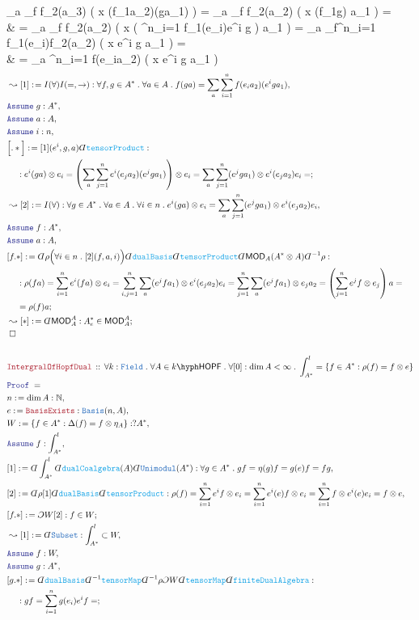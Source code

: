 \documentclass[12pt]{scrartcl}%
\newcommand{\TYPE}[1]{\textcolor{NavyBlue}{\mathtt{#1}}}%
\newcommand{\FUNC}[1]{\textcolor{Cerulean}{\mathtt{#1}}}%
\newcommand{\LOGIC}[1]{\textcolor{Blue}{\mathtt{#1}}}%
\newcommand{\THM}[1]{\textcolor{Maroon}{\mathtt{#1}}}%
\renewcommand{\.}{\; . \;} %
\newcommand{\de}{: \kern 0.1pc =} %
\newcommand{\Theorem}[2]{& \THM{#1} \, :: \, #2 \\ & \Proof = \\ } %
\newcommand{\NewLine}{\\ & \kern 1pc}%
\newcommand{\Page}[1]{ \begin{align*} #1 \end{align*}  }%
\newcommand{ \bd }{ \ByDef }%
\newcommand{\Nat}{\mathbb{N}}%
\newcommand{\Say}[3]{& #1 \de #2 : #3, \\} %
\newcommand{\Conclude}[3]{& #1 \de #2 : #3; \\}%
\newcommand{\Derive}[3]{& \leadsto #1 \de #2 : #3, \\} %
\newcommand{\DeriveConclude}[3]{& \leadsto #1 \de #2 : #3 ; \\} %
\newcommand{\Assume}[2]{& \LOGIC{Assume} \; #1 : #2, \\} %
\newcommand{\QED}{\; \square} %
\newcommand{\EndProof}{& \QED \\} %
\newcommand{\ByDef}{\rotatebox[origin=c]{-180}{$D$}}%
\newcommand{\ByConstr}{\rotatebox[origin=c]{-180}{$C$}}%
\newcommand{\Proof}{\LOGIC{Proof} \; } %
\newcommand{\Field}{\TYPE{Field}}
\newcommand{\RAMOD}[1]{\mathsf{MOD}_{#1}}%
\newcommand{\HOPF}[1]{#1\hyph\mathsf{HOPF}}%
\newcommand{\RHMOD}[1]{\mathsf{MOD}^{#1}_{#1}}%
\begin{document}
{{		 \sum_a \sum_f  f_2(a_3)  \Big( x \;  (f_1a_2)(ga_1) \Big) = 
		 \sum_a \sum_f   f_2(a_2)  \big(  x \; (f_1g) a_1 \big) = \NewLine = 
		 \sum_a \sum_f   f_2(a_2)  \left(  x \; \left( \sum^n_{i=1} f_1(e_i)e^i g \right) a_1 \right) =  
		 \sum_a \sum_f\sum^n_{i=1}    f_1(e_i)f_2(a_2)   (  x \;  e^i g  a_1  ) = \NewLine =  
		 \sum_a \sum^n_{i=1}  f(e_ia_2) ( x \; e^i g a_1 )  
	}
}\Page{
	\Derive{[1]}{I(\forall)I(=,\to)}{\forall f,g \in A^* \. \forall a \in A \.  f(ga) = \sum_a \sum^n_{i=1} f(e_ia_2)(e^i g a_1) }
	\Assume{g}{A^*}
	\Assume{a}{A}
	\Assume{i}{n}
	\Conclude{\Big[.*\Big]}
	{[1](e^i,g,a)\bd \FUNC{tensorProduct}}
	{   
		\NewLine :
		e^i(ga) \otimes e_i  =
		\left( \sum_a \sum^n_{j=1} e^i(e_ja_2)(e^j g a_1) \right) \otimes e_i =
		\sum_a \sum^n_{j=1}  (e^j g a_1)  \otimes e^i(e_ja_2)e_i =             
	}
	\Derive{[2]}{I(\forall)}{
		\forall g \in A^* \. 
		\forall a \in A \. 
		\forall i \in n \. 
		e^i(ga) \otimes e_i = \sum_a \sum^n_{j=1} (e^j g a_1) \otimes e^i(e_ja_2)e_i
	}
	\Assume{f}{A^*}
	\Assume{a}{A}
	\Conclude{[f.*]}
	{
		\bd \rho 
		\Big(\forall i \in n \. [2](f,a,i) \Big)
		\bd \FUNC{dualBasis} \bd \FUNC{tensorProduct}
		\bd \RAMOD{A}(A^* \otimes A)
		\bd^{-1} \rho
	}{
		\NewLine :
		\rho(fa) = 
		\sum^n_{i=1} e^i(fa) \otimes e_i =
		\sum^n_{i,j=1} \sum_a  (e^j f a_1) \otimes e^i(e_ja_2)e_i = 
		\sum^n_{j=1} \sum_a   (e^j  f a_1) \otimes  e_j a_2 = 
		\left( \sum^n_{j=1} e^j f \otimes e_j \right) a = \NewLine = 
		\rho(f)a
	}
	\DeriveConclude{[*]}{\bd \RHMOD{A}}{A^*_e \in \RHMOD{A}}
	\EndProof
	\\
	\Theorem{IntergralOfHopfDual}
	{
		\forall k : \Field \.
		\forall A \in \HOPF{k} \.
		\forall [0] : \dim A < \infty \.
		\int^l_{A^*} = \{ f \in A^* : \rho(f) = f \otimes e  \}
	}
	\Say{n}{\dim A}{\Nat}
	\Say{e}{\THM{BasisExists}}{\TYPE{Basis}(n,A)}
	\Say{W}{\{f \in A^* : \Delta(f) = f \otimes \eta_A \}}{?A^*}
	\Assume{f}{\int^l_{A^*}}
	\Say{[1]}{\bd \int^l_{A^*} \bd \FUNC{dualCoalgebra}(A) \bd \TYPE{Unimodul}(A^*)}{ \forall g \in A^* \. gf = \eta(g)f = g(e)f = fg}
	\Say{[2]}{ \bd \rho [1] \bd \FUNC{dualBasis} \bd \FUNC{tensorProduct}   }{
			\rho(f) = \sum^n_{i=1} e^i f \otimes e_i =
			\sum^n_{i=1} e^i(e) f \otimes e_i =
			\sum^n_{i=1} f \otimes e^i(e)e_i  = 
			 f \otimes e    
		}
	\Conclude{[f.*]}{\ByConstr W[2]}{f \in W}
	\Derive{[1]}{\bd \TYPE{Subset}}{\int^l_{A^*} \subset W}
	\Assume{f}{W}
	\Assume{g}{A^*}
	\Conclude{[g.*]}{ \bd \FUNC{dualBasis} \bd^{-1} \FUNC{tensorMap} \bd^{-1} \rho \ByConstr W \bd \FUNC{tensorMap} 
		\bd \FUNC{finiteDualAlgebra}}
	{   
		\NewLine :
		gf = 
		\sum^n_{i=1} g(e_i)e^i f  =  
}}
\end{document}
